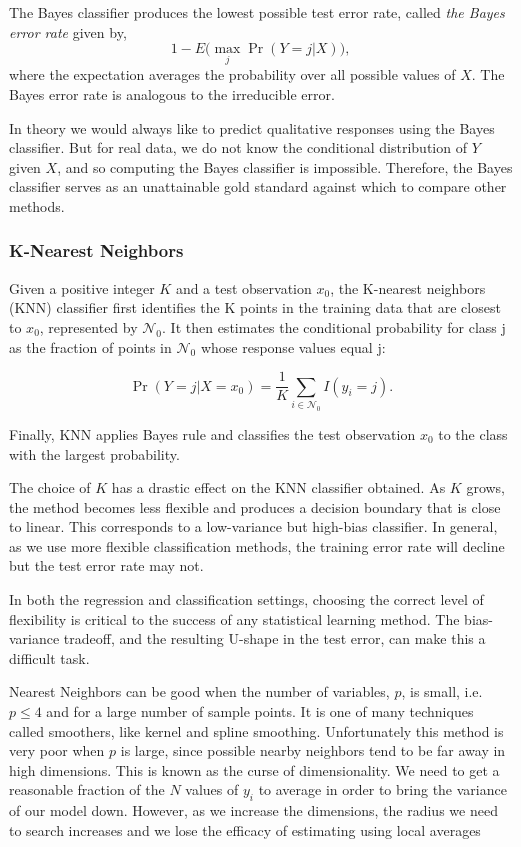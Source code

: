 \documentclass{article}
\begin{document}
The Bayes classifier produces the lowest possible test error rate, called \textit{the Bayes error rate} given by,
\[
1 - E \big( \max_j \Pr(Y = j|X) \big ),
\]
where the expectation averages the probability over all possible values of $X$. The Bayes error rate is analogous to the irreducible error.

In theory we would always like to predict qualitative responses using the Bayes classifier. But for real data, we do not know the conditional distribution of $Y$ given $X$, and so computing the Bayes classifier is impossible. Therefore, the Bayes classifier serves as an unattainable gold standard against which to compare other methods.

\subsubsection{K-Nearest Neighbors}
Given a positive integer $K$ and a test observation $x_0$, the K-nearest neighbors (KNN) classifier first identifies the K points in the training data that are closest to $x_0$, represented by $ \mathcal N_0$. It then estimates the conditional probability for class j as the fraction of points in $ \mathcal N_0$ whose response values equal j:

\[
    \Pr(Y = j|X = x_0) = \frac{1}{K} \sum_{i \in \mathcal N_0} I(y_i = j).
\]

Finally, KNN applies Bayes rule and classifies the test observation $x_0$ to the class with the largest probability.

The choice of $K$ has a drastic effect on the KNN classifier obtained. As $K$ grows, the method becomes less flexible and produces a decision boundary that is close to linear. This corresponds to a low-variance but high-bias classifier. In
general, as we use more flexible classification methods, the training error rate will decline but the test error rate may not.

In both the regression and classification settings, choosing the correct level of flexibility is critical to the success of any statistical learning method. The bias-variance tradeoff, and the resulting U-shape in the test error, can make this a difficult task. 

Nearest Neighbors can be good when the number of variables, $p$, is small, i.e. $p \leq 4$ and for a large number of sample points. It is one of many techniques called smoothers, like kernel and spline smoothing. Unfortunately this method is very poor when $p$ is large, since possible nearby neighbors tend to be far away in high dimensions. This is known as the curse of dimensionality. We need to get a reasonable fraction of the $N$ values of $y_i$ to average in order to bring the variance of our model down. However, as we increase the dimensions, the radius we need to search increases and we lose the efficacy of estimating using local averages
\end{document}
